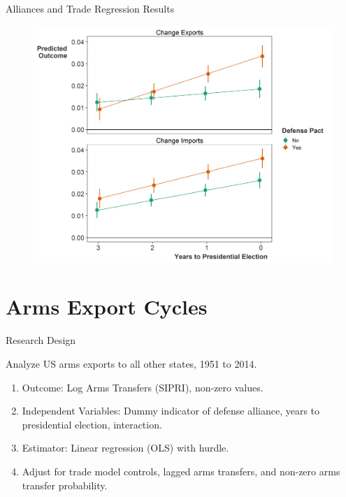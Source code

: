 \documentclass[12pt]{beamer}
\begin{document}

\begin{frame}{Alliances and Trade Regression Results}

\begin{figure}[htbp]
	\centering
		\includegraphics[height=.9\textheight]{us-elec-pred-exim.png}
\end{figure}

\end{frame} 




\section{Arms Export Cycles} 


\begin{frame}{Research Design}

\pause
Analyze US arms exports to all other states, 1951 to 2014. 
\pause
\begin{enumerate}
\item Outcome: Log Arms Transfers (SIPRI), non-zero values. 
\pause
\item Independent Variables: Dummy indicator of defense alliance, years to presidential election, interaction. 
\pause 
\item Estimator: Linear regression (OLS) with hurdle. 
\pause 
\item Adjust for trade model controls, lagged arms transfers, and non-zero arms transfer probability.
\end{enumerate} 

\end{frame} 
\end{document}
